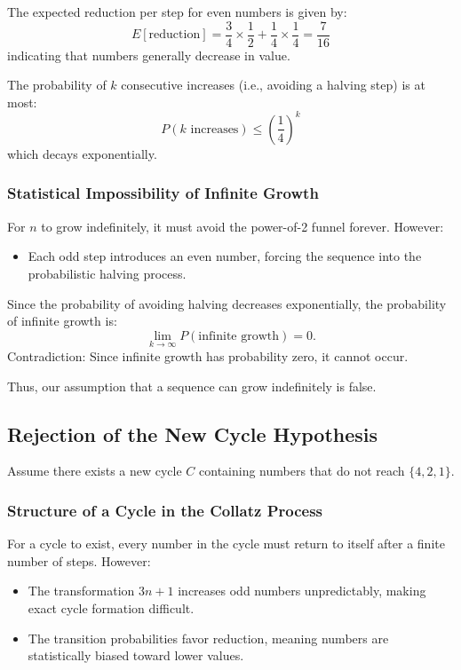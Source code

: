 The expected reduction per step for even numbers is given by:
\[
E[\text{reduction}] = \frac{3}{4} \times \frac{1}{2} + \frac{1}{4} \times \frac{1}{4} = \frac{7}{16}
\]
indicating that numbers generally decrease in value.

The probability of \( k \) consecutive increases (i.e., avoiding a halving step) is at most:
\[
P(k \text{ increases}) \leq \left(\frac{1}{4}\right)^k
\]
which decays exponentially.

\subsubsection{Statistical Impossibility of Infinite Growth}
For \( n \) to grow indefinitely, it must avoid the power-of-2 funnel forever. However:
\begin{itemize}
    \item Each odd step introduces an even number, forcing the sequence into the probabilistic halving process.
\end{itemize}

Since the probability of avoiding halving decreases exponentially, the probability of infinite growth is:
\[
\lim_{k \to \infty} P(\text{infinite growth}) = 0.
\]
Contradiction: Since infinite growth has probability zero, it cannot occur.

Thus, our assumption that a sequence can grow indefinitely is false.

\subsection{Rejection of the New Cycle Hypothesis}
Assume there exists a new cycle \( C \) containing numbers that do not reach \(\{4, 2, 1\}\).

\subsubsection{Structure of a Cycle in the Collatz Process}
For a cycle to exist, every number in the cycle must return to itself after a finite number of steps. However:
\begin{itemize}
    \item The transformation \(3n + 1\) increases odd numbers unpredictably, making exact cycle formation difficult.
    \item The transition probabilities favor reduction, meaning numbers are statistically biased toward lower values.
\end{itemize}

